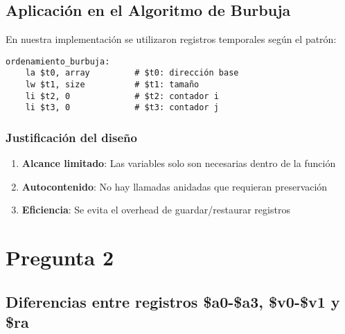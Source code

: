 \documentclass{article}
\begin{document}
\subsection*{Aplicación en el Algoritmo de Burbuja}

En nuestra implementación se utilizaron registros temporales según el patrón:

\begin{verbatim}
ordenamiento_burbuja:
    la $t0, array         # $t0: dirección base
    lw $t1, size          # $t1: tamaño
    li $t2, 0             # $t2: contador i
    li $t3, 0             # $t3: contador j
\end{verbatim}

\subsubsection*{Justificación del diseño}

\begin{enumerate}
    \item \textbf{Alcance limitado}: Las variables solo son necesarias dentro de la función
    \item \textbf{Autocontenido}: No hay llamadas anidadas que requieran preservación
    \item \textbf{Eficiencia}: Se evita el overhead de guardar/restaurar registros
\end{enumerate}


\section*{Pregunta 2}
\subsection*{Diferencias entre registros \$a0-\$a3, \$v0-\$v1 y \$ra}
\end{document}

